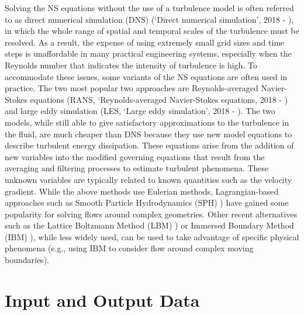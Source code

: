 Solving the NS equations without the use of a turbulence model is often referred to as direct numerical simulation (DNS) (`Direct numerical simulation', 2018 -  \cite{Orszag1970DNS}), in which the whole range of spatial and temporal scales of the turbulence must be resolved. As a result, the expense of using extremely small grid sizes and time steps is unaffordable in many practical engineering systems, especially when the Reynolds number that indicates the intensity of turbulence is high. To accommodate these issues, some variants of the NS equations are often used in practice. The two most popular two approaches are Reynolds-averaged Navier-Stokes equations (RANS, `Reynolds-averaged Navier-Stokes equations, 2018 - \cite{Reynolds1895RANS, Chou1945RANS} ) and large eddy simulation (LES, `Large eddy simulation', 2018 - \cite{Deardorff1970LES}). The two models, while still able to give satisfactory approximations to the turbulence in the fluid, are much cheaper than DNS because they use new model equations to describe turbulent energy dissipation. These equations arise from the addition of new variables into the modified governing equations that result from the averaging and filtering processes to estimate turbulent phenomena. These unknown variables are typically related to known quantities such as the velocity gradient.  
While the above methods use Eulerian methods, Lagrangian-based approaches such as Smooth Particle Hydrodynamics (SPH) \cite{Gingold1977SPH, Lucy1977SPH, Lind2020SPH}) have gained some popularity  for solving flows around complex geometries.  Other recent alternatives such as the Lattice Boltzmann Method (LBM) \cite{Chen1998LBM}) or Immersed Boundary Method (IBM) \cite{Peskin1972IBM, Peskin1977IBM, Peskin2002IBM}), while less widely used, can be used to take advantage of specific physical phenomena (e.g., using IBM to consider flow around complex moving boundaries).  
 
\section{Input and Output Data}
\label{sec:resp_cfd_water_io}

